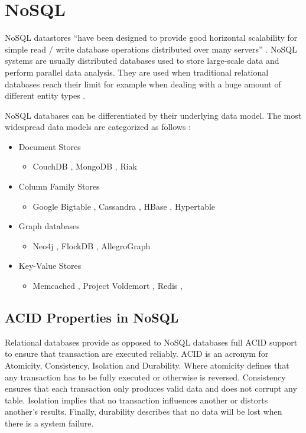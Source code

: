 \section{NoSQL}
\label{sec:nosql}
\acf{NoSQL} datastores \enquote{have been designed to provide good horizontal scalability for simple read / write database operations distributed over many servers} \cite[1]{cattell.2011}. \ac{NoSQL} systems are usually distributed databases used to store large-scale data and perform parallel data analysis. They are used when traditional relational databases reach their limit for example when dealing with a huge amount of different entity types \cite[2 - 3]{orend.2010}.

NoSQL databases can be differentiated by their underlying data model. The most widespread data models are categorized as follows \cite[34]{ellis.2010} \cite[2 - 3]{hecht.2011}:

\begin{itemize}
  \item Document Stores
    \begin{itemize}
      \item CouchDB \cite{couch.2014}, MongoDB \cite{mongo.2014}, Riak \cite{riak.2014}
    \end{itemize}
  \item Column Family Stores
    \begin{itemize}
      \item Google Bigtable \cite{chang.2006}, Cassandra \cite{cassandra.2014}, HBase \cite{hbase.2014}, Hypertable \cite{hypertable.2014}
    \end{itemize}
  \item Graph databases
    \begin{itemize}
      \item Neo4j \cite{neo4j.2014}, FlockDB \cite{flock.2010}, AllegroGraph \cite{allegro.2014}
    \end{itemize}
  \item Key-Value Stores
    \begin{itemize}
      \item Memcached \cite{memcached.2014}, Project Voldemort \cite{voldemort.2013}, Redis \cite{redis.2014},
    \end{itemize}
\end{itemize}

\subsection{ACID Properties in NoSQL}
\label{subsec:acid}
Relational databases provide as opposed to \ac{NoSQL} databases full ACID support to ensure that transaction are executed reliably. ACID is an acronym for Atomicity, Consistency, Isolation and Durability. Where atomicity defines that any transaction has to be fully executed or otherwise is reversed. Consistency ensures that each transaction only produces valid data and does not corrupt any table. Isolation implies that no transaction influences another or distorts another's results. Finally, durability describes that no data will be lost when there is a system failure. \cite[71]{pokorny.2011}

